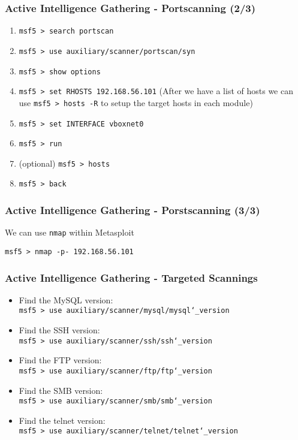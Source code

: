 \documentclass[aspectratio=169]{beamer}
\begin{document}
\begin{frame}
\frametitle{Active Intelligence Gathering - Portscanning (2/3)}

\begin{enumerate}
    \item \texttt{msf5 > search portscan}
    \item \texttt{msf5 > use auxiliary/scanner/portscan/syn}
    \item \texttt{msf5 > show options}
    \item \texttt{msf5 > set RHOSTS 192.168.56.101} (After we have a list of hosts we can use \texttt{msf5 > hosts -R} to setup the target hosts in each module)
    \item \texttt{msf5 > set INTERFACE vboxnet0}
    \item \texttt{msf5 > run}
    \item (optional) \texttt{msf5 > hosts}
    \item \texttt{msf5 > back}
\end{enumerate}

\end{frame}

\begin{frame}
\frametitle{Active Intelligence Gathering - Porstscanning (3/3)}

We can use \texttt{nmap} within Metasploit

\indent\texttt{msf5 > nmap -p- 192.168.56.101}\\

\end{frame}

\begin{frame}
\frametitle{Active Intelligence Gathering - Targeted Scannings}

\begin{itemize}
    \item Find the MySQL version:\\
    \noindent\texttt{msf5 > use auxiliary/scanner/mysql/mysql\char`\_version}
    \item Find the SSH version:\\
    \noindent\texttt{msf5 > use auxiliary/scanner/ssh/ssh\char`\_version}
    \item Find the FTP version:\\
    \noindent\texttt{msf5 > use auxiliary/scanner/ftp/ftp\char`\_version}
    \item Find the SMB version:\\
    \noindent\texttt{msf5 > use auxiliary/scanner/smb/smb\char`\_version}
    \item Find the telnet version:\\
    \noindent\texttt{msf5 > use auxiliary/scanner/telnet/telnet\char`\_version}
\end{itemize}

\end{frame}
\end{document}
